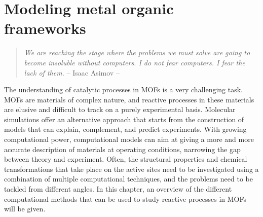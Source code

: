 \graphicspath{{figures/chapter2/}}
\renewcommand\evenpagerightmark{{\scshape\small Modeling metal organic frameworks}} 
\renewcommand\oddpageleftmark{{\scshape\small Chapter 2}}


\hyphenation{}

\chapter[Modeling metal organic frameworks]%
{Modeling metal organic frameworks}
\label{ch2}

\begin{flushright}
\begin{quotation}
\textit{We are reaching the stage where the problems we must solve are going to become insoluble without computers. I do not fear computers. I fear the lack of them.} -- Isaac Asimov --
\end{quotation}
\end{flushright}
\npar
The understanding of catalytic processes in MOFs is a very challenging task. MOFs are materials of complex nature, and reactive processes in these materials are elusive and difficult to track on a purely experimental basis. Molecular simulations offer an alternative approach that starts from the construction of models that can explain, complement, and predict experiments. With growing computational power, computational models can aim at giving a more and more accurate description of materials at operating conditions, narrowing the gap between theory and experiment. Often, the structural properties and chemical transformations that take place on the active sites need to be investigated using a combination of multiple computational techniques, and the problems need to be tackled from different angles. 
In this chapter, an overview of the different computational methods that can be used to study reactive processes in MOFs will be given. 

